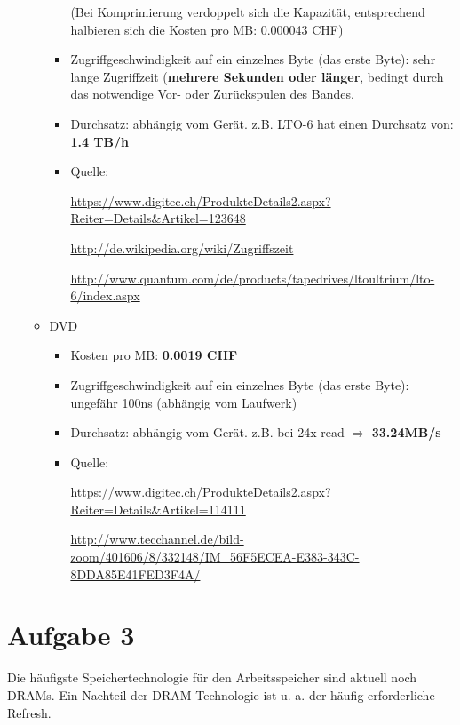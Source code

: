 \documentclass[10pt]{article}
\begin{document}
\begin{enumerate}[label=\alph*)]
\begin{itemize}
\begin{itemize}
						(Bei Komprimierung verdoppelt sich die Kapazität, entsprechend halbieren sich die Kosten pro MB: 0.000043 CHF)
						
						\item Zugriffgeschwindigkeit auf ein einzelnes Byte (das erste Byte): sehr lange Zugriffzeit (\textbf{mehrere Sekunden oder länger}, bedingt durch das notwendige Vor- oder Zurückspulen des Bandes. 
						
						\item Durchsatz: abhängig vom Gerät.
						z.B. LTO-6 hat einen Durchsatz von: \textbf{1.4 TB/h}
						
						\item Quelle:
						
							\url{https://www.digitec.ch/ProdukteDetails2.aspx?Reiter=Details&Artikel=123648}
							
							\url{http://de.wikipedia.org/wiki/Zugriffszeit}
						
							\url{http://www.quantum.com/de/products/tapedrives/ltoultrium/lto-6/index.aspx}
						
					\end{itemize}
					
				\item DVD
					\begin{itemize}
						\item Kosten pro MB: \textbf{0.0019 CHF}
						
						\item Zugriffgeschwindigkeit auf ein einzelnes Byte (das erste Byte): ungefähr 100ns (abhängig vom Laufwerk)
						
						\item Durchsatz: abhängig vom Gerät. z.B. bei 24x read $\Rightarrow$ \textbf{33.24MB/s}
						
						\item Quelle:
							
							\url{https://www.digitec.ch/ProdukteDetails2.aspx?Reiter=Details&Artikel=114111}
							
							\url{http://www.tecchannel.de/bild-zoom/401606/8/332148/IM_56F5ECEA-E383-343C-8DDA85E41FED3F4A/}
					\end{itemize}
			\end{itemize}	
\end{enumerate}

\newpage
\section*{Aufgabe 3}
Die häufigste Speichertechnologie für den Arbeitsspeicher sind aktuell noch DRAMs. Ein Nachteil der DRAM-Technologie ist u. a. der häufig erforderliche Refresh.
\end{document}
